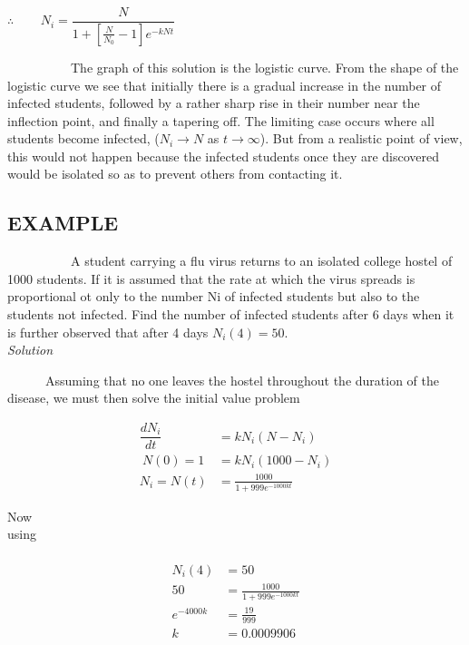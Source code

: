 $\therefore $
$~~~~~~~~N_{i}=\dfrac{N}{1+[\frac{N}{N_{0}}-1]e^{-kNt}}$
\\
	
\par ~~~~~~~~~~The graph of this solution is the logistic curve. From the shape of the logistic curve we see that initially there is a gradual increase in the number of infected students, followed by a rather sharp rise in their number near the inflection point, and finally a tapering off. The limiting case occurs where all students become infected,  ($N_{i}\rightarrow N$ as $t \rightarrow \infty$). But from a realistic point of view, this would not happen because  the infected students once they are discovered would be isolated so  as to prevent others from contacting it.

\subsection*{EXAMPLE}

	
	
\par ~~~~~~~~~~A student carrying a flu virus returns to an isolated college hostel of 1000 students. If it is assumed that the rate at which the virus spreads is proportional ot only to the number Ni of infected students but also to the students not infected. Find the number of infected students after 6 days when it is further observed that after 4 days $N_{i}(4)=50$.  \\ 


\textit {\Large Solution} \\ 
\par ~~~~~~Assuming that no one leaves the hostel throughout the duration of   the disease, we must then solve the initial value problem
\begin{center}
	\begin{eqnarray*}
		\dfrac{dN_{i}}{dt}&=kN_{i}(N-N_{i}) \\  
	  \	N(0)=1&=kN_{i}(1000-N_{i}) \\
		N_{i}=N(t)&=\frac{1000}{1+999e^{-1000kt}} 
	\end{eqnarray*}
\end{center}

\begin{center}
	Now using~~~~~~~~~~~~~~~~~~~~~~~~~~~~~~~~~~~~~~~~~~~~~~~~~~~~~~~~~~~~~~~~~~~~~~~~~~ 
	\begin{eqnarray*}
			N_{i}(4)&=50 \\
			50&=\frac{1000}{1+999e^{-1000kt}}  \\
	 		e^{-4000k}&=\frac{19}{999}  \\
			k&=0.0009906  
	\end{eqnarray*}
\end{center}

